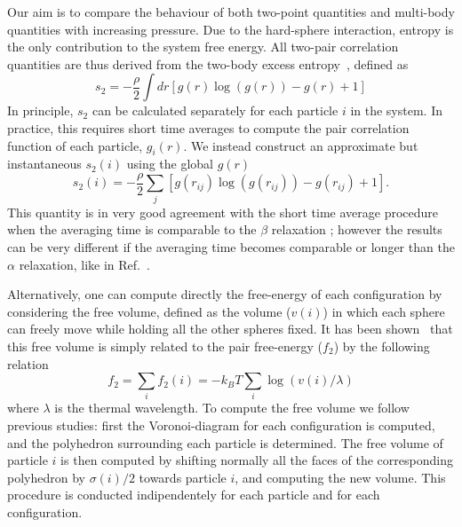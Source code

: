 \documentclass[twocolumn,superscriptaddress]{revtex4-1}
\begin{document}
Our aim is to compare the behaviour of both two-point quantities and multi-body quantities with increasing pressure.
Due to the hard-sphere interaction, entropy is the only contribution to the system free energy.
All two-pair correlation quantities are thus derived from the two-body excess entropy~\cite{Nettleton1958,Mountain1971},
defined as
\begin{equation}
s_2=-\frac{\rho}{2}\int dr\left[g(r)\log(g(r))-g(r)+1\right]
\end{equation}
In principle, $s_2$ can be calculated separately for each particle $i$ in the system. In practice, this requires short time averages to compute the pair correlation function of each particle, $g_i(r)$\cite{tanaka}. We instead construct an approximate but instantaneous $s_2(i)$ using the global $g(r)$
\begin{equation}
s_2(i) = -\frac{\rho}{2}\sum_j \left[g(r_{ij})\log(g(r_{ij}))-g(r_{ij})+1\right].
\end{equation}
This quantity is in very good agreement with the short time average procedure when the averaging time is comparable to the $\beta$ relaxation ; however the results can be very different if the averaging time becomes comparable or longer than the $\alpha$ relaxation, like in Ref.~\cite{tanaka}.

Alternatively, one can compute directly the free-energy of each configuration by
considering the free volume, defined as the volume ($v(i)$) in which each sphere can freely
move while holding all the other spheres fixed. It has been shown~\cite{Aste2004} that this free
volume is simply related to the pair free-energy ($f_2$) by the following relation
\begin{equation}
f_2=\sum_i f_2(i)=-k_BT\sum_i \log(v(i)/\lambda)
\end{equation}
where $\lambda$ is the thermal wavelength. To compute the free volume we follow previous
studies: first the Voronoi-diagram for each configuration is computed, and the polyhedron
surrounding each particle is determined. The free volume of particle $i$ is then
computed by shifting normally all the faces of the corresponding polyhedron by $\sigma(i)/2$
towards particle $i$, and computing the new volume. This procedure is conducted indipendentely
for each particle and for each configuration.
\end{document}
